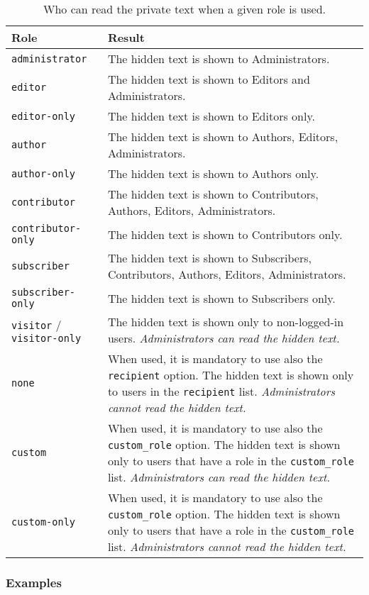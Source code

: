 \begin{table}
 \centering
 \begin{tabular}[t]{l p{7cm}}
 \toprule
 \textbf{Role} & \textbf{Result} \\
 \midrule
 \verb+administrator+ & The hidden text is shown to Administrators. \\
 \verb+editor+ & The hidden text is shown to Editors and Administrators. \\
 \verb+editor-only+ & The hidden text is shown to Editors only. \\
 \verb+author+ & The hidden text is shown to Authors, Editors, Administrators.
 \\
 \verb+author-only+ & The hidden text is shown to Authors only. \\
 \verb+contributor+ & The hidden text is shown to Contributors, Authors,
 Editors, Administrators. \\
 \verb+contributor-only+ & The hidden text is shown to Contributors only. \\
 \verb+subscriber+ & The hidden text is shown to Subscribers, Contributors,
 Authors, Editors, Administrators. \\
 \verb+subscriber-only+ & The hidden text is shown to Subscribers only. \\
 \verb+visitor+ / \verb+visitor-only+ & The hidden text is shown only to
 non-logged-in users. \textit{Administrators can read the hidden text.} \\
 \verb+none+ & When used, it is mandatory to use also the \verb+recipient+
 option. The hidden text is shown only to users in the \verb+recipient+ list.
 \textit{Administrators cannot read the hidden text.} \\
 \verb+custom+ & When used, it is mandatory to use also the \verb+custom_role+
 option. The hidden text is shown only to users that have a role in the
 \verb+custom_role+ list. \textit{Administrators can read the hidden text.} \\
 \verb+custom-only+ & When used, it is mandatory to use also the
 \verb+custom_role+ option. The hidden text is shown only to users that have a
 role in the \verb+custom_role+ list. \textit{Administrators cannot read the
 hidden text.} \\
 \bottomrule
 \end{tabular}
 \caption{Who can read the private text when a given role is used.}
 \label{table:roles}
\end{table}

\subsubsection{Examples}

